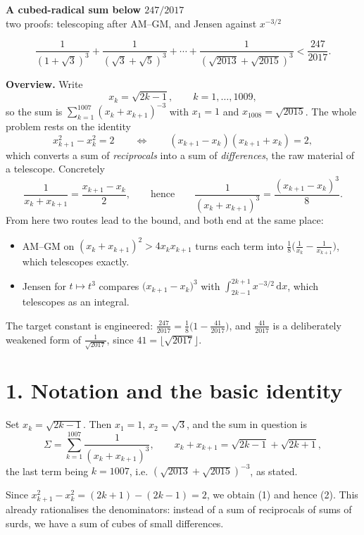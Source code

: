 \documentclass[12pt]{article}
\newcommand{\dd}{\,\mathrm{d}}
\newcommand{\xk}{x_k}
\newcommand{\xkp}{x_{k+1}}
\begin{document}
\begin{center}
{\Large\bfseries A cubed-radical sum below \(247/2017\)}\\[0.35em]
{\large two proofs: telescoping after AM--GM, and Jensen against \(x^{-3/2}\)}
\end{center}

\[
\boxed{\displaystyle
\frac1{(1+\sqrt3)^3}
+\frac1{(\sqrt3+\sqrt5)^3}
+\cdots+
\frac1{(\sqrt{2013}+\sqrt{2015})^3}
<\frac{247}{2017}.}
\]

\textbf{Overview.}
Write
\[
x_k=\sqrt{2k-1},\qquad k=1,\dots,1009,
\]
so the sum is \(\sum_{k=1}^{1007}(\xk+\xkp)^{-3}\) with
\(x_1=1\) and \(x_{1008}=\sqrt{2015}\). The whole problem rests on the
identity
\[
\xkp^2-\xk^2=2
\qquad\Longleftrightarrow\qquad
(\xkp-\xk)(\xkp+\xk)=2,
\tag{1}
\]
which converts a sum of \emph{reciprocals} into a sum of
\emph{differences}, the raw material of a telescope. Concretely
\[
\frac1{\xk+\xkp}=\frac{\xkp-\xk}{2},
\qquad\text{hence}\qquad
\frac1{(\xk+\xkp)^3}=\frac{(\xkp-\xk)^3}{8}.
\tag{2}
\]
From here two routes lead to the bound, and both end at the same place:

\begin{itemize}
\item[(A)] AM--GM on \((\xk+\xkp)^2>4\xk\xkp\) turns each term into
\(\frac18\bigl(\frac1{\xk}-\frac1{\xkp}\bigr)\), which telescopes exactly.
\item[(B)] Jensen for \(t\mapsto t^3\) compares
\(\bigl(\xkp-\xk\bigr)^3\) with \(\int_{2k-1}^{2k+1}x^{-3/2}\dd x\),
which telescopes as an integral.
\end{itemize}

The target constant is engineered: \(\frac{247}{2017}=\frac18\bigl(1-\frac{41}{2017}\bigr)\),
and \(\frac{41}{2017}\) is a deliberately weakened form of
\(\frac1{\sqrt{2017}}\), since \(41=\lfloor\sqrt{2017}\rfloor\).

\section*{1. Notation and the basic identity}

Set \(x_k=\sqrt{2k-1}\). Then \(x_1=1\), \(x_2=\sqrt3\), and the sum in
question is
\[
\Sigma=\sum_{k=1}^{1007}\frac1{(\xk+\xkp)^3},
\qquad
\xk+\xkp=\sqrt{2k-1}+\sqrt{2k+1},
\]
the last term being \(k=1007\), i.e. \((\sqrt{2013}+\sqrt{2015})^{-3}\),
as stated.

Since \(\xkp^2-\xk^2=(2k+1)-(2k-1)=2\), we obtain (1) and hence (2). This
already rationalises the denominators: instead of a sum of reciprocals of
sums of surds, we have a sum of cubes of small differences.
\end{document}
